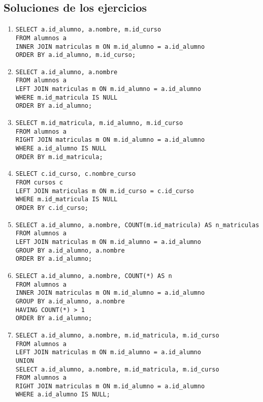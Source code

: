 \documentclass[11pt,a4paper]{article}
\begin{document}
\subsection*{Soluciones de los ejercicios }
\begin{enumerate}[leftmargin=1.2em,label=\textbf{\arabic*.}]
\item
\begin{lstlisting}
SELECT a.id_alumno, a.nombre, m.id_curso
FROM alumnos a
INNER JOIN matriculas m ON m.id_alumno = a.id_alumno
ORDER BY a.id_alumno, m.id_curso;
\end{lstlisting}

\item
\begin{lstlisting}
SELECT a.id_alumno, a.nombre
FROM alumnos a
LEFT JOIN matriculas m ON m.id_alumno = a.id_alumno
WHERE m.id_matricula IS NULL
ORDER BY a.id_alumno;
\end{lstlisting}

\item
\begin{lstlisting}
SELECT m.id_matricula, m.id_alumno, m.id_curso
FROM alumnos a
RIGHT JOIN matriculas m ON m.id_alumno = a.id_alumno
WHERE a.id_alumno IS NULL
ORDER BY m.id_matricula;
\end{lstlisting}

\item
\begin{lstlisting}
SELECT c.id_curso, c.nombre_curso
FROM cursos c
LEFT JOIN matriculas m ON m.id_curso = c.id_curso
WHERE m.id_matricula IS NULL
ORDER BY c.id_curso;
\end{lstlisting}

\item
\begin{lstlisting}
SELECT a.id_alumno, a.nombre, COUNT(m.id_matricula) AS n_matriculas
FROM alumnos a
LEFT JOIN matriculas m ON m.id_alumno = a.id_alumno
GROUP BY a.id_alumno, a.nombre
ORDER BY a.id_alumno;
\end{lstlisting}

\item
\begin{lstlisting}
SELECT a.id_alumno, a.nombre, COUNT(*) AS n
FROM alumnos a
INNER JOIN matriculas m ON m.id_alumno = a.id_alumno
GROUP BY a.id_alumno, a.nombre
HAVING COUNT(*) > 1
ORDER BY a.id_alumno;
\end{lstlisting}

\item
\begin{lstlisting}
SELECT a.id_alumno, a.nombre, m.id_matricula, m.id_curso
FROM alumnos a
LEFT JOIN matriculas m ON m.id_alumno = a.id_alumno
UNION
SELECT a.id_alumno, a.nombre, m.id_matricula, m.id_curso
FROM alumnos a
RIGHT JOIN matriculas m ON m.id_alumno = a.id_alumno
WHERE a.id_alumno IS NULL;
\end{lstlisting}


\end{enumerate}
\end{document}
